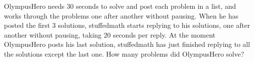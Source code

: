 OlympusHero needs $30$ seconds to solve and post each problem in a list, and works through the problems one after another without pausing. When he has posted the first $3$ solutions, stuffedmath starts replying to his solutions, one after another without pausing, taking $20$ seconds per reply. At the moment OlympusHero posts his last solution, stuffedmath has just finished replying to all the solutions except the last one. How many problems did OlympusHero solve?
